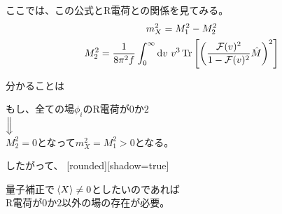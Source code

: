 \documentclass[
  unicode,a4paper,9pt,
  xcolor = {dvipsnames,svgnames},
  hyperref ={colorlinks=true,citecolor=Navy,linkcolor=NavyBlue,urlcolor=purple},
  ja=standard,lualatex
]{beamer}
\begin{document}
\begin{frame}
  \frametitle{\subsecname}

  ここでは、この公式とR電荷との関係を見てみる。
  \begin{gather}
    m_{X}^2=M_{1}^2-M_{2}^2
    \nonumber
    \\
    M_{2}^2
    =
    \frac{1}{8\pi^2 f}\int_{0}^{\infty}\dd v\
    v^3\Tr\left[ \left( \frac{\mathcal{F}(v)^2}{1-\mathcal{F}(v)^2}\hat{M}  \right)^2 \right]
    \nonumber
  \end{gather}

  分かることは
  \begin{center}
    もし、全ての場$\phi_{i}$のR電荷が$0$か$2$ \\
    ${\Big \Downarrow}$ \\
    $M_{2}^2=0$となって$m_{X}^2=M_{1}^2>0$となる。
  \end{center}

  したがって、
  [rounded][shadow=true]
  \begin{block}{}
    \centering
    量子補正で$\ev*{X}\neq 0$としたいのであれば \\
    R電荷が$0$か$2$以外の場の存在が必要。
  \end{block}

\end{frame}
\end{document}
